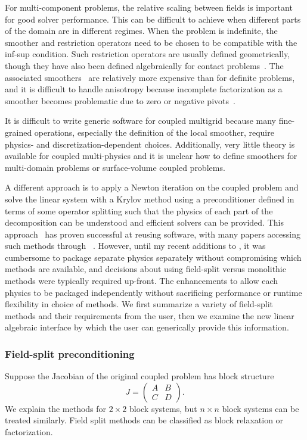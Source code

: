 For multi-component problems, the relative scaling between fields is important for good solver performance.
This can be difficult to achieve when different parts of the domain are in different regimes.
When the problem is indefinite, the smoother and restriction operators need to be chosen to be compatible with the inf-sup condition.
Such restriction operators are usually defined geometrically, though they have also been defined algebraically for contact problems~\citep{adams2004amm}.
The associated smoothers~\citep{vanka1986block} are relatively more expensive than for definite problems, and it is difficult to handle anisotropy because incomplete factorization as a smoother becomes problematic due to zero or negative pivots~\citep{higham2002accuracy,deniet2007solving}.

It is difficult to write generic software for coupled multigrid because many fine-grained operations, especially the definition of the local smoother, require physics- and discretization-dependent choices.
Additionally, very little theory is available for coupled multi-physics and it is unclear how to define smoothers for multi-domain problems or surface-volume coupled problems.

A different approach is to apply a Newton iteration on the coupled problem and solve the linear system with a Krylov method using a preconditioner defined in terms of some operator splitting such that the physics of each part of the decomposition can be understood and efficient solvers can be provided.
This approach~\citep{knoll2004jfn} has proven successful at reusing software, with many papers accessing such methods through {\PETSc}~\citep{petsc-web-page}.
However, until my recent additions to {\PETSc}, it was cumbersome to package separate physics separately without compromising which methods are available, and decisions about using field-split versus monolithic methods were typically required up-front.
The enhancements to {\PETSc} allow each physics to be packaged independently without sacrificing performance or runtime flexibility in choice of methods.
We first summarize a variety of field-split methods and their requirements from the user, then we examine the new linear algebraic interface by which the user can generically provide this information.

\subsubsection{Field-split preconditioning}
Suppose the Jacobian of the original coupled problem has block structure
\begin{equation}\label{eq:fieldsplit:jacobian}
  J = \begin{pmatrix} A & B \\ C & D \end{pmatrix} .
\end{equation}
We explain the methods for $2\times 2$ block systems, but $n\times n$ block systems can be treated similarly.
Field split methods can be classified as block relaxation or factorization.

